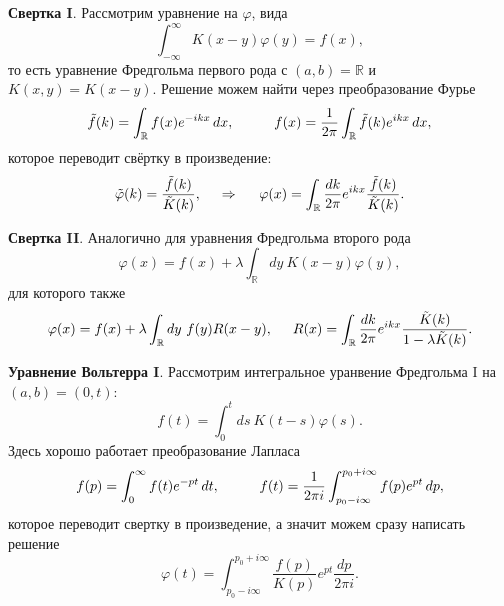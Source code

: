 \textbf{Свертка I}. Рассмотрим уравнение на $\varphi$, вида
\begin{equation}
	\int_{-\infty}^{\infty} K(x-y) \varphi(y) = f(x),
\end{equation}
то есть уравнение Фредгольма первого рода с $(a, b) = \mathbb{R}$
 и $K(x,y) = K(x-y)$. 
Решение можем найти через преобразование Фурье 
\begin{equation*}
	\tilde{f}(k) = \int_{\mathbb{R}} f(x) e^{-ikx} \d x,
	\hspace{10 mm} 
	f(x) = \frac{1}{2 \pi}\int_{\mathbb{R}} \tilde{f} (k) e^{i k x} \d x,
\end{equation*}
которое переводит свёртку в произведение:
\begin{equation}
	\tilde{\varphi}(k) = \frac{\tilde{f}(k)}{\tilde{K}(k)},
	\hspace{0.5cm} \Rightarrow \hspace{0.5cm}
	 \varphi(x) = \int_{\mathbb{R}} \frac{dk}{2\pi} e^{ikx} \frac{\tilde{f}(k)}{\tilde{K}(k)}.
\end{equation}

\textbf{Свертка II}. Аналогично для уравнения Фредгольма второго рода
\begin{equation}
	\varphi(x) = f(x) + \lambda \int_{\mathbb{R}} dy\ K(x-y) \varphi(y),
\end{equation}
для которого также
\begin{equation}
	\varphi(x) = f(x) + \lambda \int_{\mathbb{R}} dy\ f(y) R(x-y),
	\hspace{5 mm} 
	R(x) = \int_{\mathbb{R}} \frac{dk}{2\pi} e^{ik x} \frac{\tilde{K}(k)}{1-\lambda \tilde{K}(k)}.
\end{equation}

\textbf{Уравнение Вольтерра I}. Рассмотрим интегральное уранвение Фредгольма I на $(a,b) = (0, t)$:
\begin{equation*}
	f(t) = \int_{0}^{t} ds\ K(t-s) \varphi(s).
\end{equation*}
Здесь хорошо работает преобразование Лапласа 
\begin{equation*}
	f(p) = \int_{0}^{\infty}  f(t) e^{-pt} \d t,
	\hspace{10 mm} 
	f(t) = \frac{1}{2 \pi i}\int_{p_0 - i \infty}^{p_0 + i \infty} f(p) e^{pt} \d p,
\end{equation*}
которое переводит свертку в произведение, а значит можем сразу написать решение
\begin{equation}
	\varphi(t)  = \int_{p_0 - i \infty}^{p_0 + i \infty} \frac{f(p)}{K(p)} e^{pt} \frac{dp}{2\pi i}.
\end{equation}

